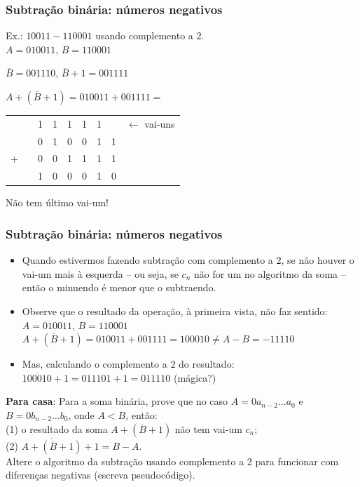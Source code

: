 \documentclass{beamer}
\begin{document}
\begin{frame}
\frametitle{Subtração binária: números negativos}
Ex.: $10011 - 110001$ usando complemento a $2$.\\[12pt]

$A = 010011$, $B = 110001$\\[12pt]

\pause

$\overline{B} = 001110$, $\overline{B} + 1 = 001111$\\[12pt]

\pause

$A + (\overline{B} + 1) = 010011 + 001111 =$\\[12pt]

\pause

\begin{tabular}{ccccccccl}
    &           & 1 & 1 & 1 & 1 & 1 &   & $\longleftarrow$ vai-uns \\
    &           & 0 & 1 & 0 & 0 & 1 & 1 \\
$+$ &           & 0 & 0 & 1 & 1 & 1 & 1 \\
\hline
    & \fbox{\phantom{1}}  & 1 & 0 & 0 & 0 & 1 & 0 \\
\end{tabular}

\vspace{12pt}

Não tem último vai-um!
\end{frame}

\begin{frame}
\frametitle{Subtração binária: números negativos}

\begin{itemize}
\item Quando estivermos fazendo subtração com complemento a $2$, se não houver o vai-um mais à esquerda -- ou seja, se $c_n$ não for um no algoritmo da soma -- então o minuendo é menor que o subtraendo.
\pause
\item Observe que o resultado da operação, à primeira vista, não faz sentido:\\
$A = 010011$, $B = 110001$\\[6pt]
$A + (\overline{B} + 1) = 010011 + 001111 = 100010 \ne A-B = -11110$
\pause
\item Mas, calculando o complemento a $2$ do resultado:\\
$\overline{100010} + 1 = 011101 + 1 = 011110$ (mágica?)
\end{itemize}

\pause

\begin{minipage}{0.95\textwidth}
\textbf{Para casa}: Para a soma binária, prove que no caso $A = 0 a_{n-2} \ldots a_0$ e $B = 0 b_{n-2} \ldots b_0$, onde $A < B$, então:\\
(1) o resultado da soma $A + (\overline{B} + 1)$ não tem vai-um $c_n$;\\
(2) $\overline{A + (\overline{B} + 1)} + 1 = B - A$.\\
Altere o algoritmo da subtração usando complemento a $2$ para funcionar com diferenças negativas (escreva pseudocódigo).
\end{minipage}

\end{frame}
\end{document}
